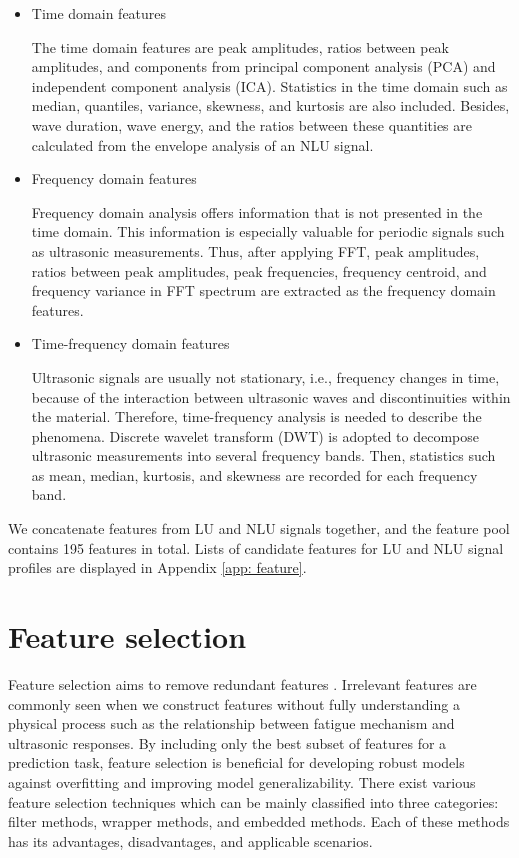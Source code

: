 \begin{itemize}
    \item Time domain features
    
    The time domain features are peak amplitudes, ratios between peak amplitudes, and components from principal component analysis (PCA) and independent component analysis (ICA). Statistics in the time domain such as median, quantiles, variance, skewness, and kurtosis are also included. Besides, wave duration, wave energy, and the ratios between these quantities are calculated from the envelope analysis of an NLU signal.

    \item Frequency domain features
    
    Frequency domain analysis offers information that is not presented in the time domain. This information is especially valuable for periodic signals such as ultrasonic measurements. Thus, after applying FFT, peak amplitudes, ratios between peak amplitudes, peak frequencies, frequency centroid, and frequency variance in FFT spectrum are extracted as the frequency domain features.

    \item Time-frequency domain features
    
    Ultrasonic signals are usually not stationary, i.e., frequency changes in time, because of the interaction between ultrasonic waves and discontinuities within the material. Therefore, time-frequency analysis is needed to describe the phenomena. Discrete wavelet transform (DWT) is adopted to decompose ultrasonic measurements into several frequency bands. Then, statistics such as mean, median, kurtosis, and skewness are recorded for each frequency band.
\end{itemize}

We concatenate features from LU and NLU signals together, and the feature pool contains 195 features in total. Lists of candidate features for LU and NLU signal profiles are displayed in Appendix \ref{app: feature}.

\section{Feature selection}
Feature selection aims to remove redundant features \cite{feature-selection-SHAO2013550}. Irrelevant features are commonly seen when we construct features without fully understanding a physical process such as the relationship between fatigue mechanism and ultrasonic responses. By including only the best subset of features for a prediction task, feature selection is beneficial for developing robust models against overfitting and improving model generalizability. There exist various feature selection techniques which can be mainly classified into three categories: filter methods, wrapper methods, and embedded methods. Each of these methods has its advantages, disadvantages, and applicable scenarios.

